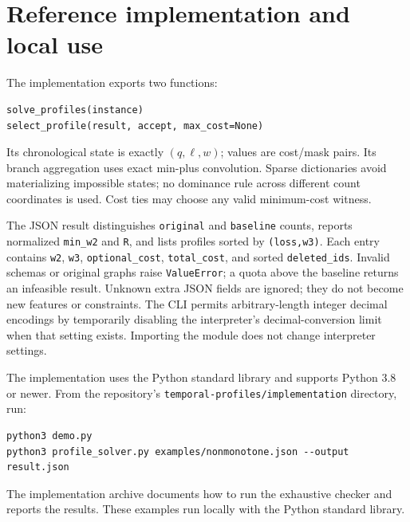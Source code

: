 \documentclass[11pt]{article}
\theoremstyle{remark}
\begin{document}
\appendix



\section{Reference implementation and local use}

\begin{minipage}{\linewidth}
The implementation exports two functions:
\begin{lstlisting}
solve_profiles(instance)
select_profile(result, accept, max_cost=None)
\end{lstlisting}
\end{minipage}

Its chronological state is exactly $(q,\ell,w)$; values are cost/mask pairs.
Its branch aggregation uses exact min-plus convolution. Sparse dictionaries
avoid materializing impossible states; no dominance rule across different
count coordinates is used. Cost ties may choose any valid minimum-cost witness.

The JSON result distinguishes \texttt{original} and \texttt{baseline} counts,
reports normalized \texttt{min\_w2} and \texttt{R}, and lists profiles sorted by
\texttt{(loss,w3)}. Each entry contains \texttt{w2}, \texttt{w3},
\texttt{optional\_cost}, \texttt{total\_cost}, and sorted
\texttt{deleted\_ids}. Invalid schemas or original graphs raise
\texttt{ValueError}; a quota above the baseline returns an infeasible result.
Unknown extra JSON fields are ignored; they do not become new features or
constraints. The CLI permits arbitrary-length integer decimal encodings by
temporarily disabling the interpreter's decimal-conversion limit when that
setting exists. Importing the module does not change interpreter settings.

The implementation uses the Python standard library and supports Python
3.8 or newer. From the repository's \texttt{temporal-profiles/implementation}
directory, run:
\begin{lstlisting}
python3 demo.py
python3 profile_solver.py examples/nonmonotone.json --output result.json
\end{lstlisting}
The implementation archive documents how to run the exhaustive checker and
reports the results. These examples run locally with the Python standard library.






\end{document}
